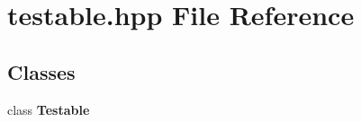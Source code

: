 \section{testable.hpp File Reference}
\label{testable_8hpp}
\subsection*{Classes}
\begin{CompactItemize}
\item 
class {\bf Testable}
\end{CompactItemize}
